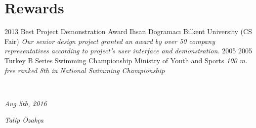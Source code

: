 \documentclass[]{friggeri-cv}
\begin{document}
\section{Rewards}
\begin{entrylist}
  \entry
    {2013}
    {Best Project Demonstration Award}
    {Ihsan Dogramacı Bilkent University (CS Fair)}
    {\emph{Our senior design project granted an award by over 50 company representatives according to project’s user interface and demonstration.}}
    \entry
    {2005}
    {2005 Turkey B Series Swimming Championship}
    {Ministry of Youth and Sports}
    {\emph{100 m. free ranked 8th in National Swimming Championship}}
\end{entrylist}
\\
\begin{flushleft}
\emph{Aug 5th, 2016}
\end{flushleft}
\begin{flushright}
\emph{Talip Özakça}
\end{flushright}

% 
\end{document}
